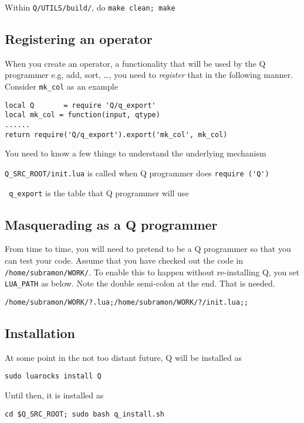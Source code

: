 \item Within \verb+Q/UTILS/build/+, do {\tt make clean; make} 
\ee

\subsection{Registering an operator}

When you create an operator, a functionality that will be used by the Q
programmer e.g, add, sort, \ldots, you need to {\em register} that in the
following manner. Consider \verb+mk_col+ as an example

\begin{verbatim}
local Q       = require 'Q/q_export'
local mk_col = function(input, qtype)
......
return require('Q/q_export').export('mk_col', mk_col)
\end{verbatim}

You need to know a few things to understand the underlying mechanism
\be
\item 
\verb+Q_SRC_ROOT/init.lua+ is called when Q programmer does 
\verb+require ('Q')+
\item \verb+ q_export+ is the table that Q programmer will use
\ee



\subsection{Masquerading as a Q programmer}
\label{masquerade}

From time to time, you will need to pretend to be a Q programmer so that you can
test your code. Assume that you have checked out the code in 
\verb+/home/subramon/WORK/+. 
To enable this to happen without re-installing Q, you set
\verb+LUA_PATH+ as below. Note the double semi-colon at the end. That is needed.
\begin{verbatim}
/home/subramon/WORK/?.lua;/home/subramon/WORK/?/init.lua;;
\end{verbatim}

\subsection{Installation}

At some point in the not too distant future, Q will be installed as 
\begin{verbatim}
sudo luarocks install Q
\end{verbatim}
Until then, it is installed as 
\begin{verbatim}
cd $Q_SRC_ROOT; sudo bash q_install.sh 
\end{verbatim}
